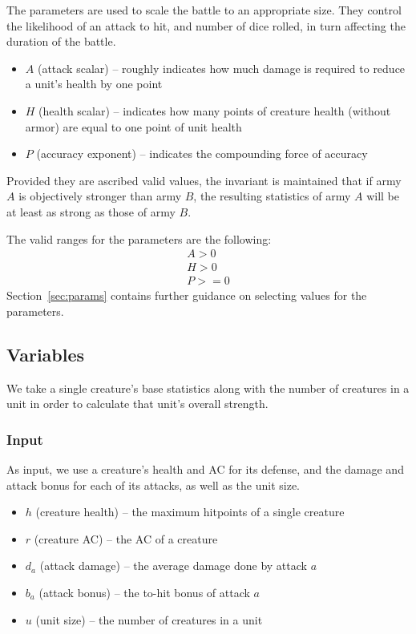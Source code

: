 \documentclass[twocolumn]{article}
\begin{document}
The parameters are used to scale the battle to an appropriate size.
They control the likelihood of an attack to hit,
and number of dice rolled,
in turn affecting the duration of the battle.

\begin{itemize}
    \item $A$ (attack scalar) -- roughly indicates how much damage is required to reduce a unit's health by one point
    \item $H$ (health scalar) -- indicates how many points of creature health (without armor) are equal to one point of unit health
    \item $P$ (accuracy exponent) -- indicates the compounding force of accuracy
\end{itemize}

Provided they are ascribed valid values,
the invariant is maintained that if army $A$ is objectively stronger than army $B$,
the resulting statistics of army $A$ will be at least as strong as those of army $B$.

The valid ranges for the parameters are the following:
\begin{align*}
    A > 0 \\
    H > 0 \\
    P >= 0
\end{align*}
Section~\ref{sec:params} contains further guidance on selecting values for the parameters.

\subsection{Variables}

We take a single creature's base statistics along with the number of creatures in a unit
in order to calculate that unit's overall strength.

\subsubsection{Input}

As input, we use a creature's health and AC for its defense,
and the damage and attack bonus for each of its attacks,
as well as the unit size.

\begin{itemize}
    \item $h$ (creature health) -- the maximum hitpoints of a single creature
    \item $r$ (creature AC) -- the AC of a creature
    \item $d_a$ (attack damage) -- the average damage done by attack $a$
    \item $b_a$ (attack bonus) -- the to-hit bonus of attack $a$
    \item $u$ (unit size) -- the number of creatures in a unit
\end{itemize}
\end{document}
